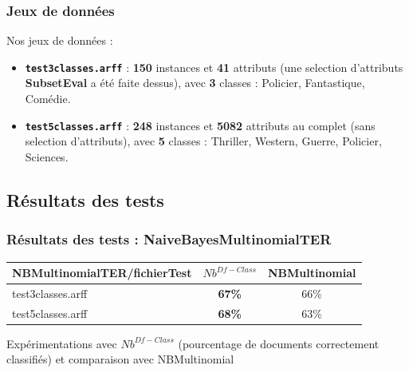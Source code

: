 \documentclass[12pt]{beamer}
\begin{document}
\begin{frame}
\frametitle{Jeux de données}

Nos jeux de données : 
\begin{itemize}
\item \texttt{\textbf{test3classes.arff}} : \textbf{150} instances et \textbf{41} attributs (une selection d'attributs \textbf{SubsetEval} a été faite dessus), avec \textbf{3} classes : Policier, Fantastique, Comédie.
\item \texttt{\textbf{test5classes.arff}} : \textbf{248} instances et \textbf{5082} attributs au complet (sans selection d'attributs), avec \textbf{5} classes : Thriller, Western, Guerre, Policier, Sciences.
\end{itemize}


\end{frame}




\subsection{Résultats des tests}
\begin{frame}
\frametitle{Résultats des tests : NaiveBayesMultinomialTER}


\begin{table}

\centering
    \begin{tabular}{|l|c||c|}
    \hline
    NBMultinomialTER/fichierTest  & $Nb^{Df-Class}$ & NBMultinomial \\ \hline
    test3classes.arff & \textbf{67\%}   & 66\%  \\ \hline
    test5classes.arff & \textbf{68\%} & 63\%  \\ \hline
    \end{tabular}
\end{table}
\medskip
Expérimentations avec $Nb^{Df-Class}$ (pourcentage de documents correctement classifiés) et comparaison avec NBMultinomial
\end{frame}
\end{document}
